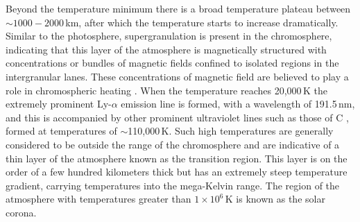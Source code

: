
Beyond the temperature minimum there is a broad temperature plateau between $\sim$$1000-2000$\,km, after which the temperature starts to increase dramatically. Similar to the photosphere, supergranulation is present in the chromosphere, indicating that this layer of the atmosphere is magnetically structured with concentrations or bundles of magnetic fields confined to isolated regions in the intergranular lanes. These concentrations of magnetic field are believed to play a role in chromospheric heating \citep{carlsson1997}. When the temperature reaches 20,000\,K the extremely prominent Ly-$\alpha$ emission line is formed, with a wavelength of 191.5\,nm, and this is accompanied by other prominent ultraviolet lines such as those of C , formed at temperatures of $\sim$110,000\,K. Such high temperatures are generally considered to be outside the range of the chromosphere and are indicative of a thin layer of the atmosphere known as the transition region. This layer is on the order of a few hundred kilometers thick but has an extremely steep temperature gradient, carrying temperatures into the mega-Kelvin range. The region of the atmosphere with temperatures greater than $1\times10^{6}$\,K is known as the solar corona.

